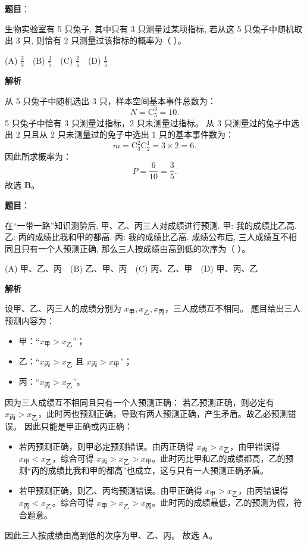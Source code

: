 \begin{answer}

\textbf{题目}：

生物实验室有 5 只兔子, 其中只有 3 只测量过某项指标, 若从这 5 只兔子中随机取出 3 只, 则恰有 2 只测量过该指标的概率为（ ）。

(A) $\frac{2}{3}$　(B) $\frac{3}{5}$　(C) $\frac{2}{5}$　(D) $\frac{1}{5}$

\textbf{解析}

从 5 只兔子中随机选出 3 只，样本空间基本事件总数为：
\nopagebreak[4]
\[N = \mathrm{C}_5^3 = 10.\]
5 只兔子中恰有 3 只测量过指标，2 只未测量过指标。
从 3 只测量过的兔子中选出 2 只且从 2 只未测量过的兔子中选出 1 只的基本事件数为：
\nopagebreak[4]
\[m = \mathrm{C}_3^2 \mathrm{C}_2^1 = 3 \times 2 = 6.\]
因此所求概率为：
\nopagebreak[4]
\[P = \frac{6}{10} = \frac{3}{5}.\]
故选 \textbf{B}。


\end{answer}
\begin{answer}

\textbf{题目}：

在“一带一路”知识测验后, 甲、乙、丙三人对成绩进行预测.
甲: 我的成绩比乙高.
乙: 丙的成绩比我和甲的都高.
丙: 我的成绩比乙高.
成绩公布后, 三人成绩互不相同且只有一个人预测正确, 那么三人按成绩由高到低的次序为（ ）。

(A) 甲、乙、丙　(B) 乙、甲、丙　(C) 丙、乙、甲　(D) 甲、丙、乙

\textbf{解析}

设甲、乙、丙三人的成绩分别为 $x_\text{甲}, x_\text{乙}, x_\text{丙}$，三人成绩互不相同。
题目给出三人预测内容为：
\begin{itemize}
\item 甲：“$x_\text{甲} > x_\text{乙}$”；
\item 乙：“$x_\text{丙} > x_\text{乙}$ 且 $x_\text{丙} > x_\text{甲}$”；
\item 丙：“$x_\text{丙} > x_\text{乙}$”。
\end{itemize}
因为三人成绩互不相同且只有一个人预测正确：
若乙预测正确，则必定有 $x_\text{丙} > x_\text{乙}$，此时丙也预测正确，导致有两人预测正确，产生矛盾。故乙必预测错误。
因此只能是甲正确或丙正确：
\begin{itemize}
\item 若丙预测正确，则甲必定预测错误。由丙正确得 $x_\text{丙} > x_\text{乙}$，由甲错误得 $x_\text{甲} < x_\text{乙}$，综合可得 $x_\text{丙} > x_\text{乙} > x_\text{甲}$。此时丙比甲和乙的成绩都高，乙的预测“丙的成绩比我和甲的都高”也成立，这与只有一人预测正确矛盾。
\item 若甲预测正确，则乙、丙均预测错误。由甲正确得 $x_\text{甲} > x_\text{乙}$，由丙错误得 $x_\text{丙} < x_\text{乙}$。综合可得 $x_\text{甲} > x_\text{乙} > x_\text{丙}$。此时丙的成绩最低，乙的预测为假，符合题意。
\end{itemize}
因此三人按成绩由高到低的次序为甲、乙、丙。
故选 \textbf{A}。


\end{answer}
